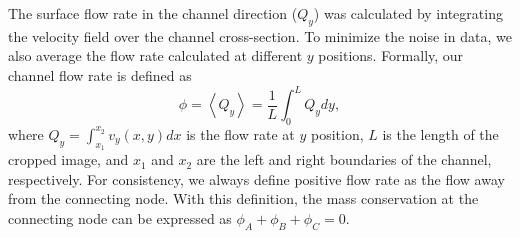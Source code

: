 \documentclass[%
10pt,
superscriptaddress,
twocolumn,
 amsmath,amssymb,
 aps,prx,
]{revtex4-2}
\begin{document}
The surface flow rate in the channel direction ($Q_y$) was calculated by integrating the velocity field over the channel cross-section.
To minimize the noise in data, we also average the flow rate calculated at different $y$ positions.
Formally, our channel flow rate is defined as
%
\begin{equation}
    \phi = \left< Q_y \right> = \frac{1}{L}\int_0^{L} Q_y dy,
\end{equation}
%
where $Q_y=\int_{x_1}^{x_2} v_y(x, y)dx$ is the flow rate at $y$ position, $L$ is the length of the cropped image, and $x_1$ and $x_2$ are the left and right boundaries of the channel, respectively.
For consistency, we always define positive flow rate as the flow away from the connecting node.
With this definition, the mass conservation at the connecting node can be expressed as $\phi_A+\phi_B+\phi_C=0$.
\end{document}
